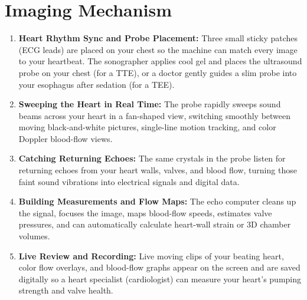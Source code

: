 \section{Imaging Mechanism}
\begin{enumerate}
\item \textbf{Heart Rhythm Sync and Probe Placement:} Three small sticky patches (ECG leads) are placed on your chest so the machine can match every image to your heartbeat. The sonographer applies cool gel and places the ultrasound probe on your chest (for a TTE), or a doctor gently guides a slim probe into your esophagus after sedation (for a TEE).
\item \textbf{Sweeping the Heart in Real Time:} The probe rapidly sweeps sound beams across your heart in a fan-shaped view, switching smoothly between moving black-and-white pictures, single-line motion tracking, and color Doppler blood-flow views.
\item \textbf{Catching Returning Echoes:} The same crystals in the probe listen for returning echoes from your heart walls, valves, and blood flow, turning those faint sound vibrations into electrical signals and digital data.
\item \textbf{Building Measurements and Flow Maps:} The echo computer cleans up the signal, focuses the image, maps blood-flow speeds, estimates valve pressures, and can automatically calculate heart-wall strain or 3D chamber volumes.
\item \textbf{Live Review and Recording:} Live moving clips of your beating heart, color flow overlays, and blood-flow graphs appear on the screen and are saved digitally so a heart specialist (cardiologist) can measure your heart's pumping strength and valve health.
\end{enumerate}


